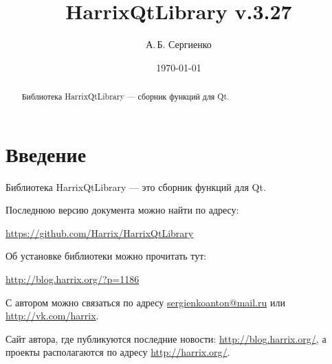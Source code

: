\documentclass[a4paper,12pt]{article}
\title{HarrixQtLibrary v.3.27}
\author{А.\,Б. Сергиенко}
\date{\today}
\begin{document}


\maketitle

\begin{abstract}
Библиотека HarrixQtLibrary --- сборник функций для Qt.
\end{abstract}

\tableofcontents

\newpage

\section{Введение}

Библиотека HarrixQtLibrary --- это сборник функций для Qt.

Последнюю версию документа можно найти по адресу:

\href{https://github.com/Harrix/HarrixQtLibrary}{https://github.com/Harrix/HarrixQtLibrary}

Об установке библиотеки можно прочитать тут:

\href{http://blog.harrix.org/?p=1186}{http://blog.harrix.org/?p=1186}

С автором можно связаться по адресу \href{mailto:sergienkoanton@mail.ru}{sergienkoanton@mail.ru} или  \href{http://vk.com/harrix}{http://vk.com/harrix}.

Сайт автора, где публикуются последние новости: \href{http://blog.harrix.org/}{http://blog.harrix.org/}, а проекты располагаются по адресу \href{http://harrix.org/}{http://harrix.org/}.

\newpage
\end{document}
